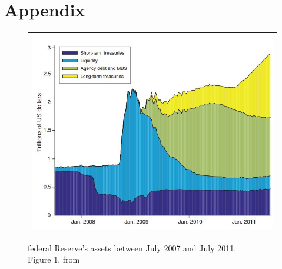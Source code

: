 \documentclass{amsart}
\theoremstyle{definition}
\theoremstyle{remark}
\numberwithin{equation}{section}
\begin{document}
\newpage




\newpage

\section*{Appendix}


\begin{figure}[h!]
    \centering
    \begin{tabular}{c}
        \includegraphics[width=0.8 \textwidth]{fedsheet.JPG}
    \end{tabular}
    \caption{federal Reserve's assets between July 2007 and July 2011.\\ Figure 1. from \cite{del2017great}}
    \label{fig:fedsheet}
\end{figure}
\end{document}
